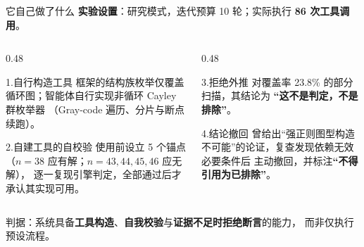 \documentclass[aspectratio=169,11pt]{beamer}
\renewcommand{\emph}[1]{\textbf{#1}}   %
\newcommand{\key}[1]{\textbf{\color{accent}#1}}
\begin{document}
\begin{frame}{它自己做了什么}
  \textbf{实验设置}：研究模式，迭代预算 10 轮；实际执行 \key{86 次工具调用}。

  \vspace{0.6em}
  \begin{columns}[T,onlytextwidth]
    \begin{column}{0.48\textwidth}
      \begin{block}{1.\quad 自行构造工具}
        \small
        框架的结构族枚举仅覆盖循环图；智能体自行实现非循环 Cayley 群枚举器
        （Gray-code 遍历、分片与断点续跑）。
      \end{block}
      \begin{block}{2.\quad 自建工具的自校验}
        \small
        使用前设立 5 个锚点（$n=38$ 应有解；$n=43,44,45,46$ 应无解），
        逐一复现引擎判定，全部通过后才承认其实现可用。
      \end{block}
    \end{column}
    \begin{column}{0.48\textwidth}
      \begin{block}{3.\quad 拒绝外推}
        \small
        对覆盖率 23.8\% 的部分扫描，其结论为
        \emph{“这不是判定，不是排除”}。
      \end{block}
      \begin{block}{4.\quad 结论撤回}
        \small
        曾给出“强正则图型构造不可能”的论证，复查发现依赖无效必要条件后
        主动撤回，并标注\emph{“不得引用为已排除”}。
      \end{block}
    \end{column}
  \end{columns}

  \vspace{0.4em}
  \footnotesize
  判据：系统具备\textbf{工具构造}、\textbf{自我校验}与\textbf{证据不足时拒绝断言}的能力，
  而非仅执行预设流程。
\end{frame}
\end{document}
